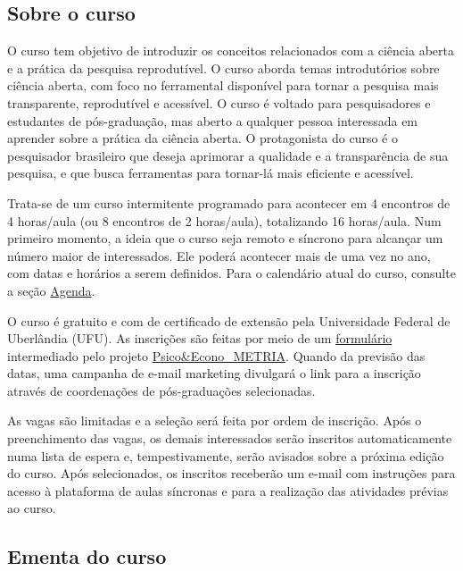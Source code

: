 \documentclass[
  a4paper,
]{article}
\begin{document}
\subsection*{Sobre o curso}\label{sec-about}


O curso tem objetivo de introduzir os conceitos relacionados com a
ciência aberta e a prática da pesquisa reprodutível. O curso aborda
temas introdutórios sobre ciência aberta, com foco no ferramental
disponível para tornar a pesquisa mais transparente, reprodutível e
acessível. O curso é voltado para pesquisadores e estudantes de
pós-graduação, mas aberto a qualquer pessoa interessada em aprender
sobre a prática da ciência aberta. O protagonista do curso é o
pesquisador brasileiro que deseja aprimorar a qualidade e a
transparência de sua pesquisa, e que busca ferramentas para tornar-lá
mais eficiente e acessível.

Trata-se de um curso intermitente programado para acontecer em 4
encontros de 4 horas/aula (ou 8 encontros de 2 horas/aula), totalizando
16 horas/aula. Num primeiro momento, a ideia que o curso seja remoto e
síncrono para alcançar um número maior de interessados. Ele poderá
acontecer mais de uma vez no ano, com datas e horários a serem
definidos. Para o calendário atual do curso, consulte a seção
\href{https://phdpablo.github.io/curso-open-science/00-schedule.html}{Agenda}.

O curso é gratuito e com de certificado de extensão pela Universidade
Federal de Uberlândia (UFU). As inscrições são feitas por meio de um
\href{https://forms.gle/wRNWAU9Ffyp7o4Vq9}{formulário} intermediado pelo
projeto
\href{https://www.youtube.com/c/PsicoEconoMETRIA}{Psico\&Econo\_METRIA}.
Quando da previsão das datas, uma campanha de e-mail marketing divulgará
o link para a inscrição através de coordenações de pós-graduações
selecionadas.

As vagas são limitadas e a seleção será feita por ordem de inscrição.
Após o preenchimento das vagas, os demais interessados serão inscritos
automaticamente numa lista de espera e, tempestivamente, serão avisados
sobre a próxima edição do curso. Após selecionados, os inscritos
receberão um e-mail com instruções para acesso à plataforma de aulas
síncronas e para a realização das atividades prévias ao curso.

\subsection*{Ementa do curso}\label{sec-ementa}
\end{document}
